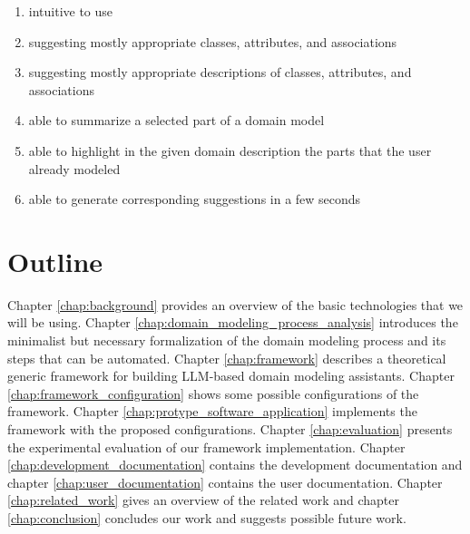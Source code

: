 \begin{enumerate}
\item intuitive to use
\item suggesting mostly appropriate classes, attributes, and associations
\item suggesting mostly appropriate descriptions of classes, attributes, and associations
\item able to summarize a selected part of a domain model
\item able to highlight in the given domain description the parts that the user already modeled
\item able to generate corresponding suggestions in a few seconds
\end{enumerate}


\section*{Outline}

Chapter \ref{chap:background} provides an overview of the basic technologies that we will be using.
Chapter \ref{chap:domain_modeling_process_analysis} introduces the minimalist but necessary formalization of the domain modeling process and its steps that can be automated.
Chapter \ref{chap:framework} describes a theoretical generic framework for building LLM-based domain modeling assistants.
Chapter \ref{chap:framework_configuration} shows some possible configurations of the framework.
Chapter \ref{chap:protype_software_application} implements the framework with the proposed configurations.
Chapter \ref{chap:evaluation} presents the experimental evaluation of our framework implementation.
Chapter \ref{chap:development_documentation} contains the development documentation and chapter \ref{chap:user_documentation} contains the user documentation. Chapter \ref{chap:related_work} gives an overview of the related work and chapter \ref{chap:conclusion} concludes our work and suggests possible future work.